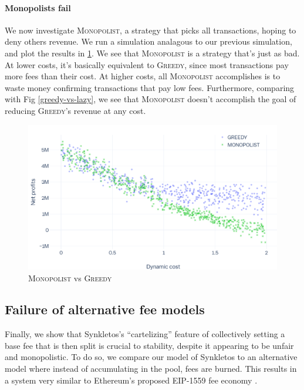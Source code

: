 \documentclass[letterpaper,12pt,oneside]{article}
\begin{document}
\paragraph*{Monopolists fail} We now investigate \textsc{Monopolist}, a strategy that picks all transactions, hoping to deny others revenue. We run a simulation analagous to our previous simulation, and plot the results in \ref{greedy-vs-mono}. We see that \textsc{Monopolist} is a strategy that's just as bad. At lower costs, it's basically equivalent to \textsc{Greedy}, since most transactions pay more fees than their cost. At higher costs, all \textsc{Monopolist} accomplishes is to waste money confirming transactions that pay low fees. Furthermore, comparing with Fig \ref{greedy-vs-lazy}, we see that \textsc{Monopolist} doesn't accomplish the goal of reducing \textsc{Greedy}'s revenue at any cost.

\begin{figure}[!h]
    \centering
    \includegraphics[width=0.8\linewidth]{greedy-vs-mono.png}
    \caption{\textsc{Monopolist} vs \textsc{Greedy}}
    \label{greedy-vs-mono}
\end{figure}

\subsection{Failure of alternative fee models}

Finally, we show that Synkletos's ``cartelizing'' feature of collectively setting a base fee that is then split is crucial to stability, despite it appearing to be unfair and monopolistic. To do so, we compare our model of Synkletos to an alternative model where instead of accumulating in the pool, fees are burned. This results in a system very similar to Ethereum's proposed EIP-1559 fee economy \cite{eip1559}.
\end{document}
